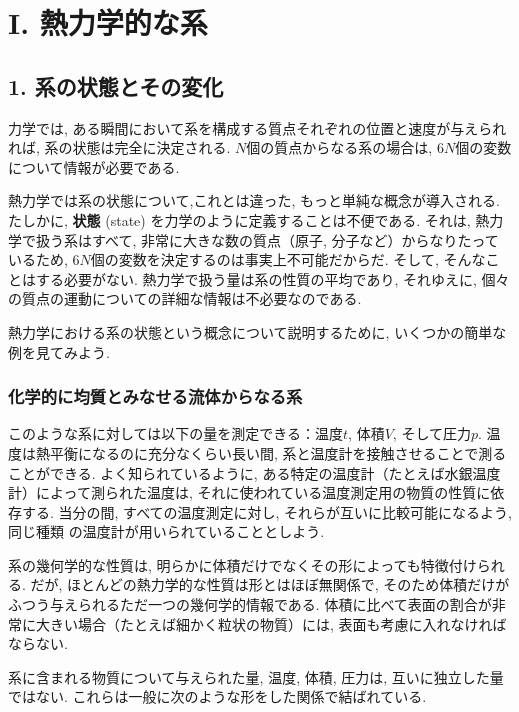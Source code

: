 
\chapter*{I. 熱力学的な系}
\section*{1. 系の状態とその変化}
力学では, ある瞬間において系を構成する質点それぞれの位置と速度が与えられれば, 系の状態は完全に決定される. $N$個の質点からなる系の場合は, $6N$個の変数について情報が必要である.\par
熱力学では系の状態について,これとは違った, もっと単純な概念が導入される. たしかに, \textbf{状態} (state) を力学のように定義することは不便である. それは, 熱力学で扱う系はすべて, 非常に大きな数の質点（原子, 分子など）からなりたっているため, $6N$個の変数を決定するのは事実上不可能だからだ. そして, そんなことはする必要がない. 熱力学で扱う量は系の性質の平均であり, それゆえに, 個々の質点の運動についての詳細な情報は不必要なのである.\par
熱力学における系の状態という概念について説明するために, いくつかの簡単な例を見てみよう.\par

\subsection*{化学的に均質とみなせる流体からなる系}
このような系に対しては以下の量を測定できる：温度$t$, 体積$V$, そして圧力$p$. 温度は熱平衡になるのに充分なくらい長い間, 系と温度計を接触させることで測ることができる. よく知られているように, ある特定の温度計（たとえば水銀温度計）によって測られた温度は, それに使われている温度測定用の物質の性質に依存する. 当分の間, すべての温度測定に対し, それらが互いに比較可能になるよう, 同じ種類
の温度計が用いられていることとしよう.\par
系の幾何学的な性質は, 明らかに体積だけでなくその形によっても特徴付けられる. だが, ほとんどの熱力学的な性質は形とはほぼ無関係で, そのため体積だけがふつう与えられるただ一つの幾何学的情報である. 体積に比べて表面の割合が非常に大きい場合（たとえば細かく粒状の物質）には, 表面も考慮に入れなければならない.\par
系に含まれる物質について与えられた量, 温度, 体積, 圧力は, 互いに独立した量ではない. これらは一般に次のような形をした関係で結ばれている.

